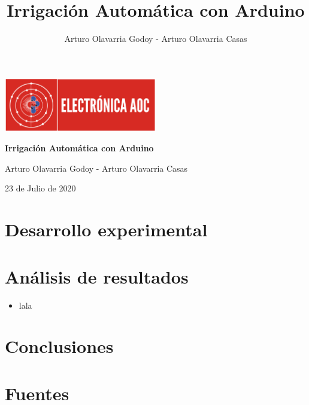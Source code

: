 \documentclass[a4paper]{article}
\title{Irrigaci\'on Autom\'atica con Arduino}
\author{Arturo Olavarria Godoy - Arturo Olavarria Casas}
\begin{document}
    \begin{titlepage}
        \centering
        {\includegraphics[width=0.5\textwidth]{./001_Recursos/000_Logo.png}\par}
        \vspace{10pt}
        {\bfseries\LARGE Irrigaci\'on Autom\'atica con Arduino \par}
        \vspace{1cm}
        {\large Arturo Olavarria Godoy - Arturo Olavarria Casas \par}
        \vfill
        {\large 23 de Julio de 2020 \par}
        \vspace{10pt}
        \doclicenseThis
    \end{titlepage}
    
    \tableofcontents
    
    

    \section{Desarrollo experimental}
    \section{Análisis de resultados}
    \begin{itemize}
        \item lala
    \end{itemize}
    \section{Conclusiones}
    \section{Fuentes}
\end{document}
